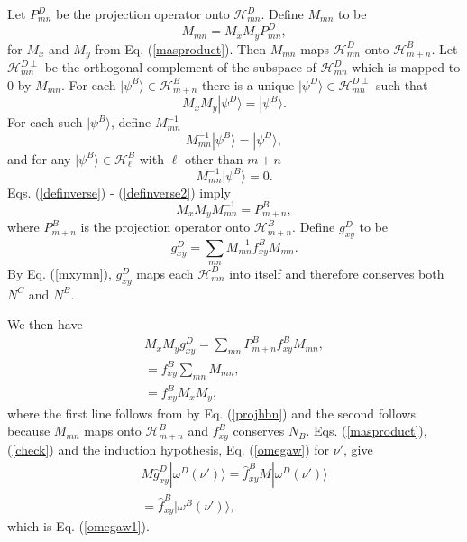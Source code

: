 \documentclass[twocolumn,amsmath,amssymb]{revtex4-1}
\begin{document}
Let $P^D_{mn}$ be the projection operator onto $\mathcal{H}^D_{mn}$.
Define $M_{mn}$ to be
\begin{equation}
  \label{mxymn}
  M_{mn} = M_x M_y P^D_{mn},
\end{equation}
for $M_x$ and $M_y$ from Eq. (\ref{masproduct}).
Then $M_{mn}$ maps $\mathcal{H}^D_{mn}$ onto $\mathcal{H}^B_{m+n}$.
Let $\mathcal{H}^{D\perp}_{mn}$  be the orthogonal complement
of the subspace of $\mathcal{H}^D_{mn}$ which is mapped
to 0 by $M_{mn}$. For each $|\psi^B \rangle  \in \mathcal{H}^B_{m+n}$
there is a unique $|\psi^D \rangle  \in \mathcal{H}^{D\perp}_{mn}$ such
that
\begin{equation}
  \label{definverse}
  M_x M_y |\psi^D \rangle  = |\psi^B \rangle .
\end{equation}
For each such $|\psi^B \rangle $, define $M_{mn}^{-1}$
\begin{equation}
  \label{definverse1}
  M_{mn}^{-1}|\psi^B \rangle  = |\psi^D \rangle ,
\end{equation}
and for any $|\psi^B \rangle  \in \mathcal{H}^B_\ell$ with
$\ell$ other than $m + n$
\begin{equation}
  \label{definverse2}
  M_{mn}^{-1}|\psi^B \rangle  = 0.
\end{equation}
Eqs. (\ref{definverse}) - (\ref{definverse2}) imply
\begin{equation}
  \label{projhbn}
  M_x M_y M_{mn}^{-1} = P^B_{m+n},
\end{equation}
where $P^B_{m+n}$ is the projection operator onto $\mathcal{H}^B_{m+n}$.
Define $g^D_{xy}$ to be
\begin{equation}
  \label{fdxy}
  g^D_{xy} = \sum_{mn} M_{mn}^{-1} f^B_{xy} M_{mn}.
\end{equation}
By Eq. (\ref{mxymn}), $g^D_{xy}$ maps each $\mathcal{H}^D_{mn}$
into itself and therefore conserves both $N^C$ and $N^B$.

  
We then have
\begin{multline}
  \label{check}
  M_x M_y g^D_{xy} = \sum_{mn} P^B_{m+n} f^B_{xy} M_{mn}, \\
  = f^B_{xy} \sum_{mn}  M_{mn}, \\
  = f^B_{xy} M_x M_y,
\end{multline}
where the first line follows from by Eq. (\ref{projhbn})
and the second follows because $M_{mn}$ maps onto
$\mathcal{H}^B_{m+n}$ and $f^B_{xy}$ conserves $N_B$.
Eqs. (\ref{masproduct}), (\ref{check}) and the induction hypothesis, Eq. (\ref{omegaw}) for
$\nu'$, give
\begin{multline}
  \label{check1}
  M \hat{g}^D_{xy} |\omega^D(\nu') \rangle  = \hat{f}^B_{xy} M|\omega^D(\nu') \rangle  \\
  = \hat{f}^B_{xy} |\omega^B(\nu') \rangle ,
\end{multline}
which is Eq. (\ref{omegaw1}).
\end{document}
